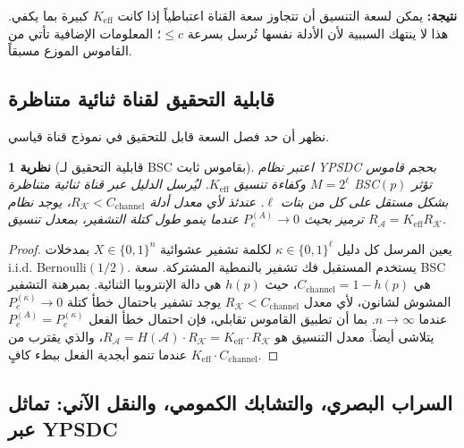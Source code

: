 \documentclass[12pt,a4paper]{article}
\newcommand{\Keff}{K_{\mathrm{eff}}}
\newtheorem{theorem}{نظرية}[section]
\theoremstyle{remark}
\begin{document}
	\noindent
	\textbf{نتيجة:} يمكن لسعة التنسيق أن تتجاوز سعة القناة اعتباطياً إذا كانت \(\Keff\) كبيرة بما يكفي. هذا لا ينتهك السببية لأن الأدلة نفسها تُرسل بسرعة \(\le c\)؛ المعلومات الإضافية تأتي من القاموس الموزع مسبقاً.
	
	\subsection{قابلية التحقيق لقناة ثنائية متناظرة}
	\label{subsec:BSC-achievability}
	
	نظهر أن حد فصل السعة قابل للتحقيق في نموذج قناة قياسي.
	
	\begin{theorem}[قابلية التحقيق لـ BSC بقاموس ثابت]
		اعتبر نظام YPSDC بحجم قاموس \(M = 2^\ell\) وكفاءة تنسيق \(K_{\mathrm{eff}}\). ليُرسل الدليل عبر قناة ثنائية متناظرة BSC\((p)\) تؤثر بشكل مستقل على كل من بتات \(\ell\). عندئذ لأي معدل أدلة \(R_{\mathcal{K}} < C_{\mathrm{channel}}\)، يوجد نظام ترميز بحيث \(P_e^{(A)} \to 0\) عندما ينمو طول كتلة التشفير، بمعدل تنسيق \(R_{\mathcal{A}} = K_{\mathrm{eff}} R_{\mathcal{K}}\).
	\end{theorem}
	
	\begin{proof}
		يعين المرسل كل دليل \(\kappa \in \{0,1\}^\ell\) لكلمة تشفير عشوائية \(X \in \{0,1\}^n\) بمدخلات i.i.d. Bernoulli\((1/2)\). يستخدم المستقبل فك تشفير بالنمطية المشتركة. سعة BSC هي \(C_{\mathrm{channel}} = 1 - h(p)\)، حيث \(h(p)\) هي دالة الإنتروبيا الثنائية. بمبرهنة التشفير المشوش لشانون، لأي معدل \(R_{\mathcal{K}} < C_{\mathrm{channel}}\) يوجد تشفير باحتمال خطأ كتلة \(P_e^{(\kappa)} \to 0\) عندما \(n \to \infty\). بما أن تطبيق القاموس تقابلي، فإن احتمال خطأ الفعل \(P_e^{(A)} = P_e^{(\kappa)}\) يتلاشى أيضاً. معدل التنسيق هو \(R_{\mathcal{A}} = H(\mathcal{A}) \cdot R_{\mathcal{K}} = K_{\mathrm{eff}} \cdot R_{\mathcal{K}}\)، والذي يقترب من \(K_{\mathrm{eff}} \cdot C_{\mathrm{channel}}\) عندما تنمو أبجدية الفعل ببطء كافٍ.
	\end{proof}
	
	\subsection{السراب البصري، والتشابك الكمومي، والنقل الآني: تماثل عبر YPSDC}
	\label{subsec:mirage-ypsdc}
	
\end{document}
